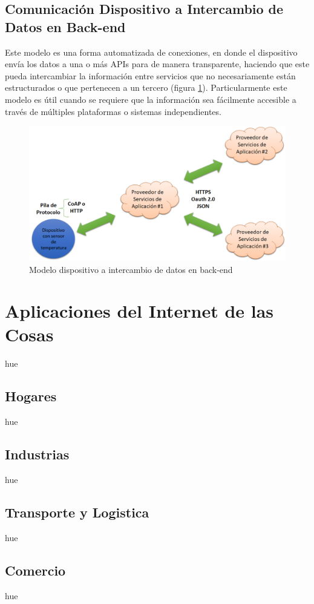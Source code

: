 \subsection{Comunicación Dispositivo a Intercambio de Datos en Back-end}
Este modelo es una forma automatizada de conexiones, en donde el dispositivo envía los datos a una o más APIs para de manera transparente, haciendo que este pueda intercambiar la información entre servicios que no necesariamente están estructurados o que pertenecen a un tercero (figura \ref{fig:d2b}). Particularmente este modelo es útil cuando se requiere que la información sea fácilmente accesible a través de múltiples plataformas o sistemas independientes.
\begin{figure}[htb]
\centering
\includegraphics[scale=0.4]{./Figuras/d2b.png}
\caption{Modelo dispositivo a intercambio de datos en back-end}
\label{fig:d2b}
\end{figure}


\section{Aplicaciones del Internet de las Cosas}
hue
\subsection{Hogares}
hue
\subsection{Industrias}
hue
\subsection{Transporte y Logistica}
hue
\subsection{Comercio}
hue
